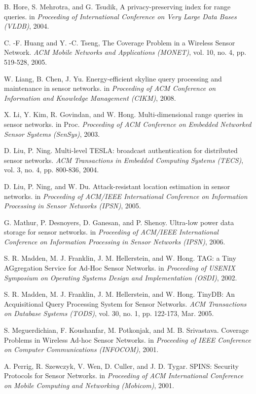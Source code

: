 \documentclass[conference]{IEEEtran}
\begin{document}
\begin{thebibliography}{1}
B. Hore, S. Mehrotra, and G. Tsudik, A privacy-preserving index for range queries. in \emph{Proceeding of International Conference on Very Large Data Bases (VLDB)}, 2004.

C. -F. Huang and Y. -C. Tseng, The Coverage Problem in a Wireless Sensor Network. \emph{ACM Mobile Networks and Applications (MONET)}, vol. 10, no. 4, pp. 519-528, 2005.

W. Liang, B. Chen, J. Yu. Energy-efficient skyline query processing and maintenance in sensor networks. in \emph{Proceeding of ACM Conference on Information and Knowledge Management (CIKM)}, 2008.

X. Li, Y. Kim, R. Govindan, and W. Hong. Multi-dimensional range queries in sensor networks. in Proc. \emph{Proceeding of ACM Conference on Embedded Networked Sensor Systems (SenSys)}, 2003.

D. Liu, P. Ning. Multi-level TESLA: broadcast authentication for distributed sensor networks. \emph{ACM Transactions in Embedded Computing Systems (TECS)}, vol. 3, no. 4, pp. 800-836, 2004.

D. Liu, P. Ning, and W. Du. Attack-resistant location estimation in sensor networks. in \emph{Proceeding of ACM/IEEE International Conference on Information Processing in Sensor Networks (IPSN)}, 2005.

G. Mathur, P. Desnoyers, D. Ganesan, and P. Shenoy. Ultra-low power data storage for sensor networks. in \emph{Proceeding of ACM/IEEE International Conference on Information Processing in Sensor Networks (IPSN)}, 2006.

S. R. Madden, M. J. Franklin, J. M. Hellerstein, and W. Hong. TAG: a Tiny AGgregation Service for Ad-Hoc Sensor Networks. in \emph{Proceeding of USENIX Symposium on Operating Systems Design and Implementation (OSDI)}, 2002.

S. R. Madden, M. J. Franklin, J. M. Hellerstein, and W. Hong. TinyDB: An Acquisitional Query Processing System for Sensor Networks. \emph{ACM Transactions on Database Systems (TODS)}, vol. 30, no. 1, pp. 122-173, Mar. 2005.

S. Meguerdichian, F. Koushanfar, M. Potkonjak, and M. B. Srivastava. Coverage Problems in Wireless Ad-hoc Sensor Networks. in \emph{Proceeding of IEEE Conference on Computer Communications (INFOCOM)}, 2001.

A. Perrig, R. Szewczyk, V. Wen, D. Culler, and J. D. Tygar. SPINS: Security Protocols for Sensor Networks. in \emph{Proceeding of ACM International Conference on Mobile Computing and Networking (Mobicom)}, 2001.


\end{thebibliography}
\end{document}
